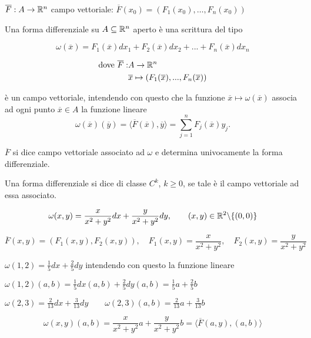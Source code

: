 {\color{blue} $\overline{F}:A\to \mathbb{R}^n$ campo vettoriale: $\overline{F}(x_0)=(F_1(x_0), \ldots, F_n(x_0))$}


\begin{definition}
	Una forma differenziale su $A \subseteq \mathbb{R}^n$ aperto è una scrittura del tipo 
	
	$$\omega (\overline{x})=F_1(\overline{x})dx_1 +F_2(\overline{x})dx_2 +...+ F_n(\overline{x})dx_n$$ 
	
	\begin{align*}
		\text{dove } \overline{F}: &A \rightarrow \mathbb{R}^n
		\\
		&\overline{x} \mapsto (F_1(\overline{x}),...,F_n(\overline{x}))
	\end{align*}
	
	è un campo vettoriale, intendendo con questo che la funzione $\overline{x}\mapsto \omega (\overline{x})$ associa ad ogni punto $\overline{x} \in A$ la funzione lineare
	\begin{equation*}
		\omega(\overline{x})(\overline{y}) =\langle \overline{F}(\overline{x}),\overline{y}\rangle =\sum_{j=1}^n F_j (\overline{x}) y_j.
	\end{equation*}
	
	$\overline{F}$ si dice campo vettoriale associato ad $\omega$ e determina univocamente la forma differenziale.
	
	Una forma differenziale si dice di classe $C^k$, $k \geq 0$, se tale è il campo vettoriale ad essa associato.
\end{definition}


\begin{exbar}
\begin{example}
	$$\omega(x,y) =\frac{x}{x^2+y^2}dx+\frac{y}{x^2+y^2}dy, \qquad (x,y)\in \mathbb{R}^2\backslash \{(0,0)\}$$
	
	$$\overline{F}(x,y)=(F_1(x,y),F_2(x,y)), \quad F_1(x,y)=\frac{x}{x^2+y^2}, \quad F_2(x,y)=\frac{y}{x^2+y^2}$$
	
	$\omega(1,2)=\frac{1}{5}dx+\frac{2}{5}dy$ intendendo con questo la funzione lineare
	
	$ \omega (1,2)(a,b)=\frac{1}{5}dx (a,b) + \frac{2}{5}dy (a,b) =\frac{1}{5}a + \frac{2}{5} b$
	
	$\omega(2,3)=\frac{2}{13}dx+\frac{3}{13}dy \qquad \omega(2,3)(a,b)=\frac{2}{13}a+\frac{3}{13}b$
	
	$$\omega(x,y)(a,b)=\frac{x}{x^2+y^2}a+ \frac{y}{x^2+y^2}b= \langle \overline{F}(a,y),(a,b) \rangle$$
\end{example}
\end{exbar}


